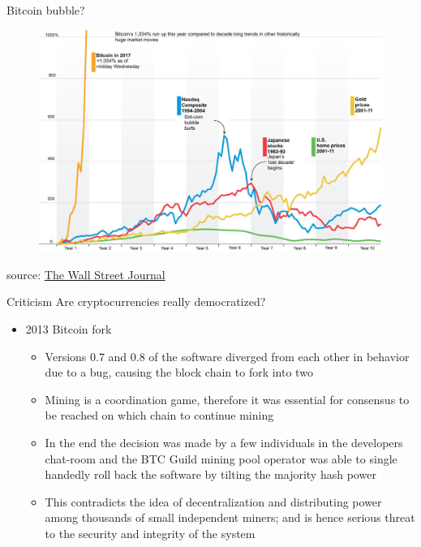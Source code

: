 \documentclass[9pt]{beamer}
\begin{document}

\begin{frame}{Bitcoin bubble?}
	\begin{figure}[]
		\centering
		\includegraphics  [width=4.in]{Images/bubble1}
	\end{figure}
	\begin{scriptsize}
		source: \href{https://www.wsj.com/articles/bitcoin-hits-10-000-as-sharp-rise-drowns-out-skeptics-1511919295}{The Wall Street Journal}
	\end{scriptsize}
\end{frame}


\begin{frame}{Criticism}
	Are cryptocurrencies really democratized? \vspace{5mm}
	\begin{itemize}
		\item 2013 Bitcoin fork
		\begin{itemize}
			\item Versions 0.7 and 0.8 of the software diverged from each other in behavior due to a bug, causing the block chain to fork into two
			\item Mining is a coordination game, therefore it was essential for consensus to be reached on which chain to continue mining
			\item In the end the decision was made by a few individuals in the developers chat-room and the BTC Guild mining pool operator was able to single handedly roll back the software by tilting the majority hash power
			\item This contradicts the idea of decentralization and distributing power among thousands of small independent miners; and is hence serious threat to the security and integrity of the system
		\end{itemize}
	\end{itemize}
\end{frame}
\end{document}
